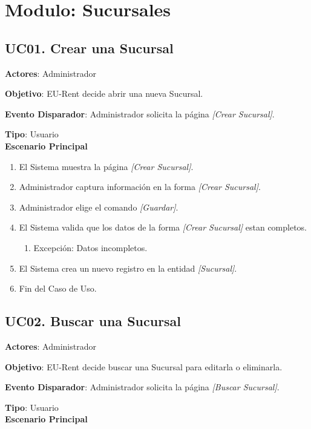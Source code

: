 \documentclass[10pt, letterpaper]{report}
\begin{document}
\section{Modulo: Sucursales}

\subsection{UC01. Crear una Sucursal} \label{CrearSucursal}
\textbf{Actores}: Administrador

\textbf{Objetivo}: EU-Rent decide abrir una nueva Sucursal.

\textbf{Evento Disparador}: Administrador solicita la página \textit{[Crear Sucursal]}.

\textbf{Tipo}: Usuario\\

\textbf{Escenario Principal}

\begin{enumerate}
\item El Sistema muestra la página \textit{[Crear Sucursal]}.
\item Administrador captura información en la forma \textit{[Crear Sucursal]}.
\item Administrador elige el comando \textit{[Guardar]}.
\item El Sistema valida que los datos de la forma \textit{[Crear Sucursal]} estan completos.
	\begin{enumerate}
		\item Excepción: Datos incompletos.
	\end{enumerate}
\item El Sistema crea un nuevo registro en la entidad \textit{[Sucursal]}.
\item Fin del Caso de Uso.
\end{enumerate}
\subsection{UC02. Buscar una Sucursal} \label{BuscarSucursal}
\textbf{Actores}: Administrador

\textbf{Objetivo}: EU-Rent decide buscar una Sucursal para editarla o eliminarla.

\textbf{Evento Disparador}: Administrador solicita la página \textit{[Buscar Sucursal]}.

\textbf{Tipo}: Usuario\\

\textbf{Escenario Principal}
\end{document}
